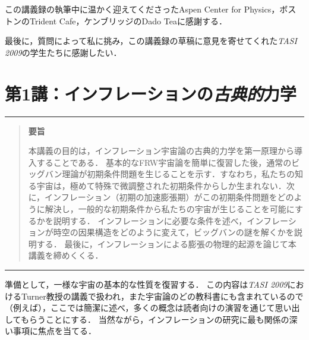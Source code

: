 この講義録の執筆中に温かく迎えてくださったAspen Center for Physics，ボストンのTrident Cafe，ケンブリッジのDado Teaに感謝する．

最後に，質問によって私に挑み，この講義録の草稿に意見を寄せてくれた{\sl TASI 2009}の学生たちに感謝したい．
\newpage
\part{第1講：インフレーションの{\sl 古典的}力学}

\vspace{0.5cm}
 \hrule \vspace{0.3cm}
\begin{quote}
{\bf 要旨}

\noindent
本講義の目的は，インフレーション宇宙論の古典的力学を第一原理から導入することである．
基本的なFRW宇宙論を簡単に復習した後，通常のビッグバン理論が初期条件問題を生じることを示す．すなわち，私たちの知る宇宙は，極めて特殊で微調整された初期条件からしか生まれない．次に，インフレーション（初期の加速膨張期）がこの初期条件問題をどのように解決し，一般的な初期条件から私たちの宇宙が生じることを可能にするかを説明する．
インフレーションに必要な条件を述べ，インフレーションが時空の因果構造をどのように変えて，ビッグバンの謎を解くかを説明する．
最後に，インフレーションによる膨張の物理的起源を論じて本講義を締めくくる．
\end{quote}
\vspace{0.1cm}  \hrule
 \vspace{0.5cm}
 
 
\label{sec:FRW}

準備として，一様な宇宙の基本的な性質を復習する．
この内容は{\sl TASI 2009}におけるTurner教授の講義で扱われ，また宇宙論のどの教科書にも含まれているので（例えば\cite{Dodelson, Mukhanov, WeinbergCosmology}），ここでは簡潔に述べ，多くの概念は読者向けの演習を通じて思い出してもらうことにする．
当然ながら，インフレーションの研究に最も関係の深い事項に焦点を当てる．



